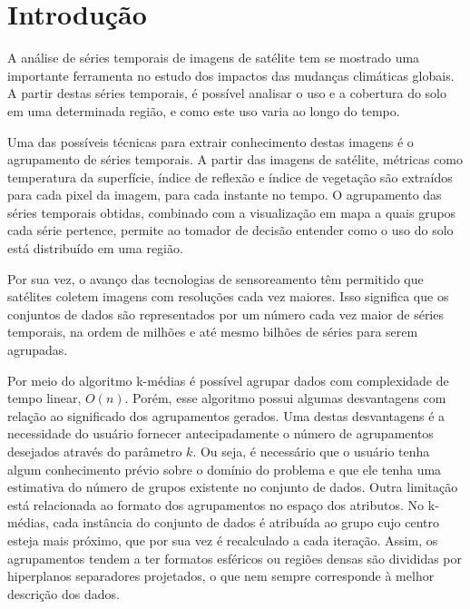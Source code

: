 \section{Introdução} \label{sec:introducao}

A análise de séries temporais de imagens de satélite tem se mostrado uma
importante ferramenta no estudo dos impactos das mudanças climáticas globais.
A partir destas séries temporais, é possível analisar o uso e a cobertura do
solo em uma determinada região, e como este uso varia ao longo do tempo.

Uma das possíveis técnicas para extrair conhecimento destas imagens é o
agrupamento de séries temporais. A partir das imagens de satélite, métricas como
temperatura da superfície, índice de reflexão e índice de vegetação são
extraídos para cada pixel da imagem, para cada instante no tempo. O agrupamento 
das séries temporais obtidas, combinado com a visualização em mapa a quais
grupos cada série pertence, permite ao tomador de decisão entender como o uso do
solo está distribuído em uma região.

Por sua vez, o avanço das tecnologias de sensoreamento têm permitido que
satélites coletem imagens com resoluções cada vez maiores. Isso significa que os
conjuntos de dados são representados por um número cada vez maior de séries
temporais, na ordem de milhões e até mesmo bilhões de séries para serem
agrupadas.

Por meio do algoritmo k-médias é possível agrupar dados com complexidade de
tempo linear, $O(n)$. Porém, esse algoritmo possui algumas desvantagens com
relação ao significado dos agrupamentos gerados. Uma destas desvantagens é a
necessidade do usuário fornecer antecipadamente o número de agrupamentos
desejados através do parâmetro $k$. Ou seja, é necessário que o usuário tenha
algum conhecimento prévio sobre o domínio do problema e que ele tenha uma
estimativa do número de grupos existente no conjunto de dados. Outra limitação
está relacionada ao formato dos agrupamentos no espaço dos atributos.
No k-médias, cada instância do conjunto de dados é atribuída ao grupo cujo
centro esteja mais próximo, que por sua vez é recalculado a cada iteração.
Assim, os agrupamentos tendem a ter formatos esféricos ou regiões densas são
divididas por hiperplanos separadores projetados, o que nem sempre corresponde à
melhor descrição dos dados.

